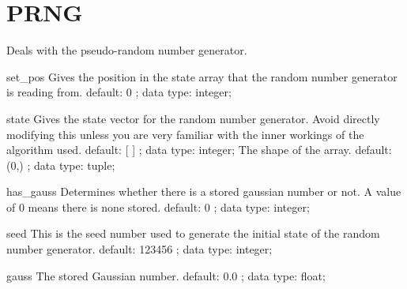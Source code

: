 \section{PRNG}
\label{PRNG}
\begin{ipifield}{}%
{Deals with the pseudo-random number generator.}%
{}%
{}
\begin{ipifield}{set\_pos}%
{Gives the position in the state array that the random number generator is reading from.}%
{default:  0 ; data type: integer; }%
{}
\end{ipifield}
\begin{ipifield}{state}%
{Gives the state vector for the random number generator. Avoid directly modifying this unless you are very familiar with the inner workings of the algorithm used.}%
{default:  [ ] ; data type: integer; }%
{%
{The shape of the array.}%
{default:  (0,) ; data type: tuple; }%
}
\end{ipifield}
\begin{ipifield}{has\_gauss}%
{Determines whether there is a stored gaussian number or not. A value of 0 means there is none stored.}%
{default:  0 ; data type: integer; }%
{}
\end{ipifield}
\begin{ipifield}{seed}%
{This is the seed number used to generate the initial state of the random number generator.}%
{default:  123456 ; data type: integer; }%
{}
\end{ipifield}
\begin{ipifield}{gauss}%
{The stored Gaussian number.}%
{default:  0.0 ; data type: float; }%
{}
\end{ipifield}
\end{ipifield}
